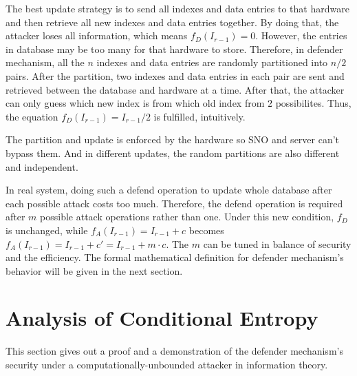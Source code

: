 \documentclass[10pt, conference, compsocconf]{IEEEtran}
\begin{document}
        The best update strategy
        is to send all indexes and data entries to that hardware and then
        retrieve all new indexes and data entries together. By doing that, the attacker
        loses all information, which means $f_D(I_{r-1}) = 0$. However, the entries
        in database may be too many for that hardware to store. Therefore, in defender mechanism,
        all the $n$ indexes and data entries are randomly partitioned into
        $n/2$ pairs.
        After the partition,
        two indexes and data entries in each pair are sent and retrieved
        between the database and hardware at a time. After that, the attacker can
        only guess which new index is from which old index from $2$ possibilites.
        Thus, the equation $f_D(I_{r-1}) = I_{r-1}/2$ is fulfilled, intuitively.

        The partition and update is enforced by the hardware so SNO
        and server can't bypass them. And in
        different updates, the random partitions are also different
        and independent.


        In real system, doing such a defend operation to update whole
        database after each possible attack costs too much.
        Therefore, the defend operation is required after $m$
        possible attack operations rather than one. Under this
        new condition, $f_D$ is unchanged, while $f_A(I_{r-1}) = I_{r-1}+c$
        becomes $f_A(I_{r-1}) = I_{r-1}+c' = I_{r-1}+m \cdot c$.
        The $m$ can be tuned in balance of security and the
        efficiency. The formal mathematical definition for
        defender mechanism's behavior will be given in the
        next section.

\section{Analysis of Conditional Entropy}\label{sec_proof}
    This section gives out a proof 
    and a demonstration
    of the defender mechanism's security under a computationally-unbounded attacker
    in information theory.
\end{document}
